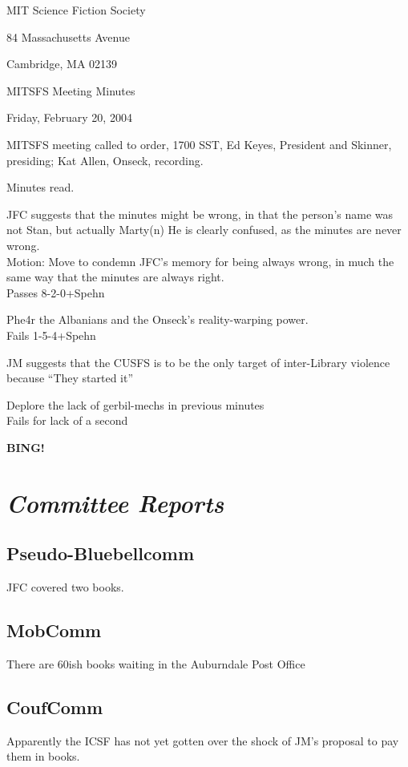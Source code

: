 \documentclass[10pt]{article}
\newcommand{\bing}{{\bf BING!} }
\newcommand{\goto}[1]{\bing \vskip 12pt \section*{{\em{#1}}}}
\begin{document}
\begin{center}

MIT Science Fiction Society 

84 Massachusetts Avenue

Cambridge, MA 02139

\vspace{12pt}

MITSFS Meeting Minutes 

Friday, February 20, 2004

\end{center}
 
\vspace{18pt}

\setlength{\parskip}{6pt}

\noindent
MITSFS meeting called to order, 1700 SST, Ed Keyes, President and
Skinner, presiding; Kat Allen,  Onseck, recording.

Minutes read.


JFC suggests that the minutes might be wrong, in that the person's name was not Stan, but actually Marty(n)  He is clearly confused, as the minutes are never wrong.\\
Motion: Move to condemn JFC's memory for being always wrong, in much the same way that the minutes are always right.\\
Passes 8-2-0+Spehn

Phe4r the Albanians and the Onseck's reality-warping power.\\
Fails 1-5-4+Spehn

JM suggests that the CUSFS is to be the only target of inter-Library
violence because ``They started it''

Deplore the lack of gerbil-mechs in previous minutes\\
Fails for lack of a second

\goto{Committee Reports}
\subsection*{Pseudo-Bluebellcomm}
JFC covered two books.
\subsection*{MobComm}
There are 60ish books waiting in the Auburndale Post Office
\subsection*{CoufComm}
Apparently the ICSF has not yet gotten over the shock of JM's proposal
to pay them in books.
\end{document}
